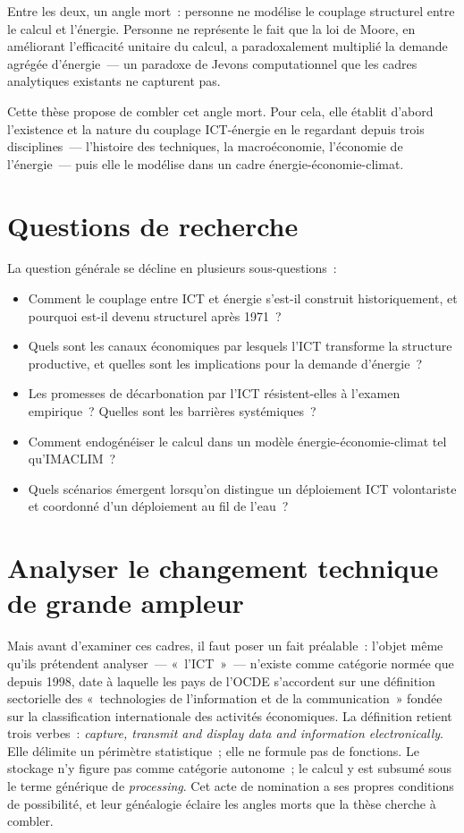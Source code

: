Entre les deux, un angle mort~: personne ne modélise le couplage structurel entre le calcul et l'énergie. Personne ne représente le fait que la loi de Moore, en améliorant l'efficacité unitaire du calcul, a paradoxalement multiplié la demande agrégée d'énergie~--- un paradoxe de Jevons computationnel que les cadres analytiques existants ne capturent pas.

Cette thèse propose de combler cet angle mort. Pour cela, elle établit d'abord l'existence et la nature du couplage ICT-énergie en le regardant depuis trois disciplines~--- l'histoire des techniques, la macroéconomie, l'économie de l'énergie~--- puis elle le modélise dans un cadre énergie-économie-climat.

\section*{Questions de recherche}

La question générale se décline en plusieurs sous-questions~:

\begin{itemize}
    \item Comment le couplage entre ICT et énergie s'est-il construit historiquement, et pourquoi est-il devenu structurel après 1971~?
    \item Quels sont les canaux économiques par lesquels l'ICT transforme la structure productive, et quelles sont les implications pour la demande d'énergie~?
    \item Les promesses de décarbonation par l'ICT résistent-elles à l'examen empirique~? Quelles sont les barrières systémiques~?
    \item Comment endogénéiser le calcul dans un modèle énergie-économie-climat tel qu'IMACLIM~?
    \item Quels scénarios émergent lorsqu'on distingue un déploiement ICT volontariste et coordonné d'un déploiement au fil de l'eau~?
\end{itemize}


\section*{Analyser le changement technique de grande ampleur}

Mais avant d'examiner ces cadres, il faut poser un fait préalable~: l'objet même qu'ils prétendent analyser~--- «~l'ICT~»~--- n'existe comme catégorie normée que depuis 1998, date à laquelle les pays de l'OCDE s'accordent sur une définition sectorielle des «~technologies de l'information et de la communication~» fondée sur la classification internationale des activités économiques. La définition retient trois verbes~: \emph{capture, transmit and display data and information electronically}. Elle délimite un périmètre statistique~; elle ne formule pas de fonctions. Le stockage n'y figure pas comme catégorie autonome~; le calcul y est subsumé sous le terme générique de \emph{processing}. Cet acte de nomination a ses propres conditions de possibilité, et leur généalogie éclaire les angles morts que la thèse cherche à combler.

